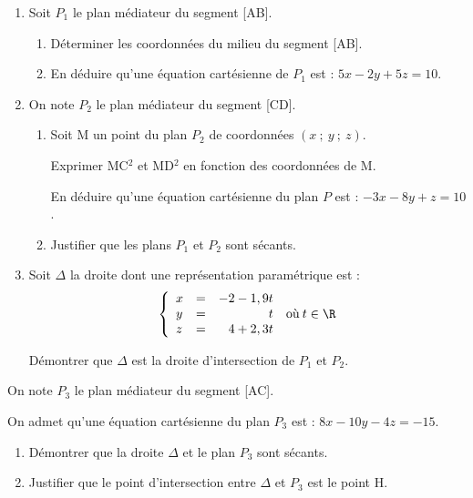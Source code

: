 \begin{enumerate}[resume]
\item Soit $P_1$ le plan médiateur du segment [AB].
	\begin{enumerate}
		\item Déterminer les coordonnées du milieu du segment [AB].
		\item En déduire qu'une équation cartésienne de $P_1$ est : $5x - 2y + 5z = 10$.
	\end{enumerate}
\item On note $P_2$ le plan médiateur du segment [CD].
	\begin{enumerate}
		\item Soit M un point du plan $P_2$ de coordonnées $(x~;~y~;~z)$.
		
Exprimer MC$^2$ et MD$^2$ en fonction des coordonnées de M.

En déduire qu’une équation cartésienne du plan $P$ est : $-3x - 8y + z = 10$.
		\item Justifier que les plans $P_1$ et $P_2$ sont sécants.
	\end{enumerate}
\item Soit $\Delta$ la droite dont une représentation paramétrique est :
\[\left\{\begin{array}{l c l}
x& =& -2 - 1,9t\\
y&= &\phantom{-2 - 1,9}t\\
z&= & \phantom{-}4 + 2,3t
\end{array}\right.\: \text{où}\: t \in \R\]

Démontrer que $\Delta$ est la droite d’intersection de $P_1$ et $P_2$.
\end{enumerate}

On note $P_3$ le plan médiateur du segment [AC].

On admet qu'une équation cartésienne du plan $P_3$ est : $8x - 10y - 4z= - 15.$

\begin{enumerate}[resume]
\item Démontrer que la droite $\Delta$ et le plan $P_3$ sont sécants.
\item Justifier que le point d’intersection entre $\Delta$ et $P_3$ est le point H.
\end{enumerate}
